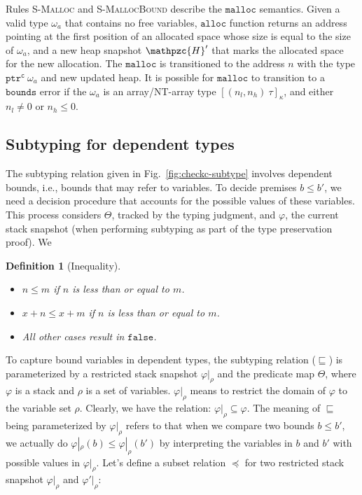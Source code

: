 \documentclass[conference]{IEEEtran}
\newtheorem{defi}{Definition}
\newcommand{\checkedc}{\text{Checked C}\xspace}
\newcommand{\kw}[1]{\ensuremath{\mathtt{#1}}}
\newcommand{\tallarrayb}[2]{\ensuremath{[{#1}~{#2}]_{\kappa}}}
\newcommand{\tallarray}[3]{\tallarrayb{({#1},{#2})}{#3}}
\newcommand{\tptr}[2]{\ensuremath{\mathtt{ptr}^{#2}~{#1}}}
\newcommand{\emalloctext}{\ensuremath{\kw{malloc}}}
\newcommand{\ebounds}{\ensuremath{\kw{bounds}}}
\newcommand{\efalse}{\ensuremath{\mathtt{false}}}
\newcommand{\heap}{\ensuremath{\mathpzc{H}}}
\newcommand{\cmode}{\texttt{c}}
\begin{document}
Rules \textsc{S-Malloc} and \textsc{S-MallocBound} describe the $\emalloctext$ semantics. Given a valid type $\omega_a$ that contains no free variables, $\mathtt{alloc}$ function returns an address pointing at the first position of an allocated space whose size is equal to the size of $\omega_a$, and a new heap snapshot $\heap'$ that marks the allocated space for the new allocation. The $\emalloctext$ is transitioned to the address $n$ with the type ${\tptr{\omega_a}{\cmode}}$ and new updated heap. It is possible for $\emalloctext$ to transition to a $\ebounds$ error if the $\omega_a$ is an array/NT-array type $\tallarray{n_l}{n_h}{\tau}$, and either $n_l \neq 0$ or $n_h \le 0$.


\subsection{Subtyping for dependent types}
\label{app:le}
  
The subtyping relation given in Fig.~\ref{fig:checkc-subtype} involves
dependent bounds, i.e., bounds that may refer to variables. To decide
premises $b \leq b'$, we need a decision procedure that accounts for
the possible values of these variables. This process considers
$\Theta$, tracked by the typing judgment, and $\varphi$, the current
stack snapshot (when performing subtyping as part of the type
preservation proof). We

\begin{defi}[Inequality]

\begin{itemize}

\item $n \le m$ if $n$ is less than or equal to $m$.
\item $x+n \le x + m$ if $n$ is less than or equal to $m$.
\item All other cases result in $\efalse$.

\end{itemize}
\end{defi}

To capture bound variables in dependent types, the \checkedc subtyping
relation ($\sqsubseteq$) is parameterized by a restricted stack
snapshot $\varphi|_{\rho}$ and the predicate map $\Theta$, where
$\varphi$ is a stack and $\rho$ is a set of
variables. $\varphi|_{\rho}$ means to restrict the domain of $\varphi$
to the variable set $\rho$. Clearly, we have the relation:
$\varphi|_{\rho} \subseteq \varphi$. The meaning of $\sqsubseteq$
being parameterized by $\varphi|_{\rho}$ refers to that when we
compare two bounds $b \le b'$, we actually do
$\varphi|_{\rho}(b) \le \varphi|_{\rho}(b')$ by interpreting the
variables in $b$ and $b'$ with possible values in $\varphi|_{\rho}$.
Let's define a subset relation $\preceq$ for two restricted stack
snapshot $\varphi|_{\rho}$ and $\varphi'|_{\rho}$:
\end{document}
